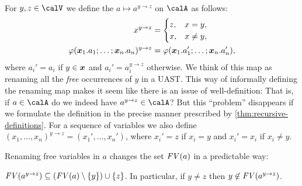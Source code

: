 \documentclass[a4paper, 11pt, article, danish, oneside]{memoir}
\DeclarePairedDelimiter{\auxdelimparen}{(}{)}
\newcommand*\union\cup
\renewcommand{\phi}{\varphi}
\newcommand{\newpar}{\paragraph{}}
\newcommand{\setVar}{\calV}
\newcommand{\freevar}[2][]{\mathit{FV}\auxdelimparen[#1]{#2}}
\begin{document}
\newpar

For $y,z \in \setVar$ we define the  $a \mapsto a^{y \to z}$ on $\calA$ as follows:
%
\begin{align*}
    x^{y \to z}
        &= \begin{cases}
            z, & x = y, \\
            x, & x \neq y,
        \end{cases} \\
    \phi(\seq{x}_1.a_1 ; \ldots ; \seq{x}_n.a_n)^{y \to z}
        &= \phi(\seq{x}_1.a_1' ; \ldots ; \seq{x}_n.a_n'),
\end{align*}
%
where $a_i' = a_i$ if $y \in \bm{x}$ and $a_i' = a_i^{y \to z}$ otherwise. We think of this map as renaming all the \emph{free} occurrences of $y$ in a UAST. This way of informally defining the renaming map makes it seem like there is an issue of well-definition: That is, if $a \in \calA$ do we indeed have $a^{y \to z} \in \calA$? But this \enquote{problem} disappears if we formulate the definition in the precise manner prescribed by \cref{thm:recursive-definitions}. For a sequence of variables we also define $(x_1, \ldots, x_n)^{y \to z} = (x_1', \ldots, x_n')$, where $x_i' = z$ if $x_i = y$ and $x_i' = x_i$ if $x_i \neq y$.

Renaming free variables in $a$ changes the set $\freevar{a}$ in a predictable way:

\begin{lemma}
    \label{lem:renaming-freevars}
    $\freevar{a^{y \to z}} \subseteq (\freevar{a} \setminus \{y\}) \union \{z\}$. In particular, if $y \neq z$ then $y \not\in \freevar{a^{y \to z}}$.
\end{lemma}
\end{document}
